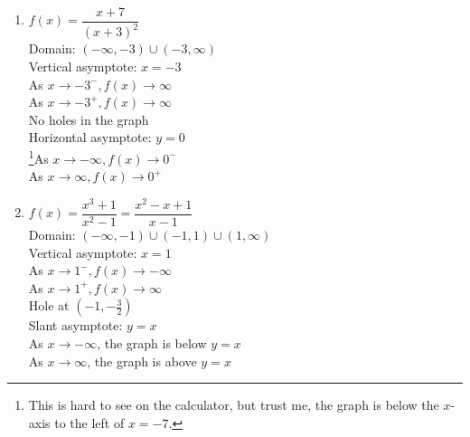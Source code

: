 \begin{multicols}{2}
\begin{enumerate}
\setcounter{enumi}{\value{HW}}

\item $f(x) = \dfrac{x + 7}{(x + 3)^{2}}$ \\
Domain: $(-\infty, -3) \cup (-3, \infty)$\\
Vertical asymptote: $x = -3$\\
As $x \rightarrow -3^{-}, f(x) \rightarrow \infty$\\
As $x \rightarrow -3^{+}, f(x) \rightarrow \infty$\\
No holes in the graph\\
Horizontal asymptote: $y = 0$ \\
\footnote{This is hard to see on the calculator, but trust me, the graph is below the $x$-axis to the left of $x = -7$.}As $x \rightarrow -\infty, f(x) \rightarrow 0^{-}$\\
As $x \rightarrow \infty, f(x) \rightarrow 0^{+}$\\

\vfill

\columnbreak

\item $f(x) = \dfrac{x^{3} + 1}{x^{2} - 1} = \dfrac{x^{2} - x+ 1}{x-1}$\\
Domain: $(-\infty, -1) \cup (-1, 1) \cup (1, \infty)$\\
Vertical asymptote: $x = 1$\\
As $x \rightarrow 1^{-}, f(x) \rightarrow -\infty$\\
As $x \rightarrow 1^{+}, f(x) \rightarrow \infty$\\
Hole at $(-1, -\frac{3}{2})$\\
Slant asymptote: $y=x$  \\
As $x \rightarrow -\infty$, the graph is below $y=x$\\
As $x \rightarrow \infty$, the graph is above $y=x$\\

\setcounter{HW}{\value{enumi}}
\end{enumerate}
\end{multicols}

